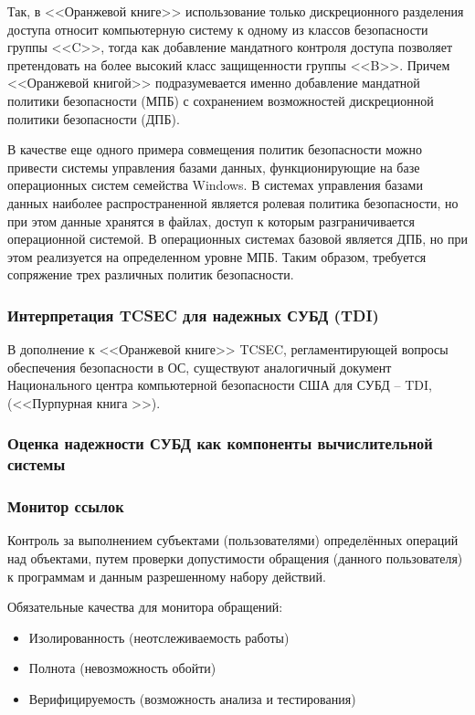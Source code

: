 Так, в <<Оранжевой книге>> использование только дискреционного разделения доступа относит компьютерную систему к одному из классов безопасности группы <<C>>, тогда как добавление мандатного контроля доступа позволяет претендовать на более высокий класс защищенности группы <<B>>. Причем <<Оранжевой книгой>> подразумевается именно добавление мандатной политики безопасности (МПБ) с сохранением возможностей дискреционной политики безопасности (ДПБ).

В качестве еще одного примера совмещения политик безопасности можно привести системы управления базами данных, функционирующие на базе операционных систем семейства Windows. В системах управления базами данных наиболее распространенной является ролевая политика безопасности, но при этом данные хранятся в файлах, доступ к которым разграничивается операционной системой. В операционных системах базовой является ДПБ, но при этом реализуется на определенном уровне МПБ. Таким образом, требуется сопряжение трех различных политик безопасности.

\subsubsection{Интерпретация TCSEC для надежных СУБД (TDI)}
В дополнение к <<Оранжевой книге>> TCSEC, регламентирующей вопросы обеспечения безопасности в ОС, существуют аналогичный документ Национального центра компьютерной безопасности США для СУБД -- TDI, (<<Пурпурная книга >>).

\subsubsection{Оценка надежности СУБД как компоненты вычислительной системы}
\subsubsection{Монитор ссылок}
Контроль за выполнением субъектами (пользователями) определённых операций над объектами, путем проверки допустимости обращения (данного пользователя) к программам и данным разрешенному набору действий.

Обязательные качества для монитора обращений:
\begin{itemize}
	\item Изолированность (неотслеживаемость работы)
	\item Полнота (невозможность обойти)
	\item Верифицируемость (возможность анализа и тестирования)
\end{itemize}

